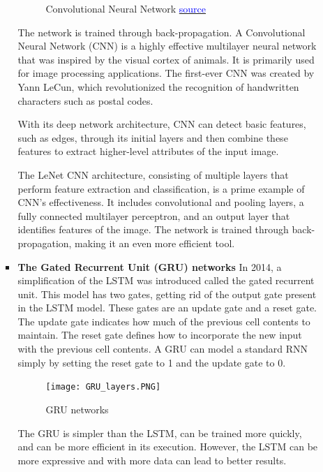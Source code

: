 \begin{itemize}
\begin{itemize}
\begin{itemize}
\begin{figure}[H]
            \caption{Convolutional Neural Network \protect\href{https://www.analyticsvidhya.com/blog/2022/01/convolutional-neural-network-an-overview/}{\textcolor{blue}{source}} }
            \label{fig:CNN}
        \end{figure}
        The network is trained through back-propagation. A Convolutional Neural Network (CNN) is a highly effective multilayer neural network that was inspired by the visual cortex of animals. It is primarily used for image processing applications. The first-ever CNN was created by Yann LeCun, which revolutionized the recognition of handwritten characters such as postal codes.
        
        With its deep network architecture, CNN can detect basic features, such as edges, through its initial layers and then combine these features to extract higher-level attributes of the input image.
        
        The LeNet CNN architecture, consisting of multiple layers that perform feature extraction and classification, is a prime example of CNN's effectiveness. It includes convolutional and pooling layers, a fully connected multilayer perceptron, and an output layer that identifies features of the image. The network is trained through back-propagation, making it an even more efficient tool. \cite{alzubaidi2021review} \cite{ansari2020building}
        
        \item  \textbf{The Gated Recurrent Unit (GRU) networks} In 2014, a simplification of the LSTM was introduced called the gated recurrent unit. This model has two gates, getting rid of the output gate present in the LSTM model. These gates are an update gate and a reset gate. The update gate indicates how much of the previous cell contents to maintain. The reset gate defines how to incorporate the new input with the previous cell contents. A GRU can model a standard RNN simply by setting the reset gate to 1 and the update gate to 0. \cite{madhavan2017deep}
        
        \begin{figure}[H]
            \centering\texttt{[image: GRU\_layers.PNG]}
            \caption{GRU networks}
        \end{figure}
        The GRU is simpler than the LSTM, can be trained more quickly, and can be more efficient in its execution. However, the LSTM can be more expressive and with more data can lead to better results.
    \end{itemize}


\end{itemize}
\end{itemize}
